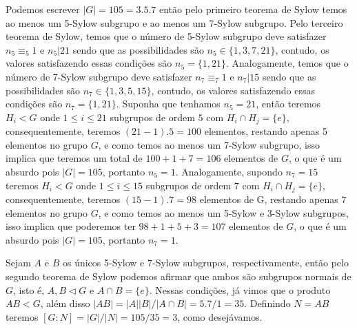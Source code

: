 \documentclass{article}
\begin{document}
\begin{enumerate}
		Podemos escrever $|G| = 105 = 3.5.7$ então pelo primeiro teorema de Sylow temos ao menos um 5-Sylow subgrupo e ao menos um 7-Sylow subgrupo. Pelo terceiro teorema de Sylow, temos que o número de 5-Sylow subgrupo deve satisfazer $n_{5} \equiv_{5} 1$ e $n_{5} | 21$ sendo que as possibilidades são $n_{5} \in \{1, 3, 7, 21\}$, contudo, os valores satisfazendo essas condições são $n_{5} = \{1, 21\}$. Analogamente, temos que o número de 7-Sylow subgrupo deve satisfazer $n_{7} \equiv_{7} 1$ e $n_{7} | 15$ sendo que as possibilidades são $n_{7} \in \{1, 3, 5, 15\}$, contudo, os valores satisfazendo essas condições são $n_{7} = \{1, 21\}$. Suponha que tenhamos $n_{5} = 21$, então teremos $H_{i} < G$ onde $1 \leq i \leq 21$ subgrupos de ordem $5$ com $H_{i} \cap H_{j} = \{e\}$, consequentemente, teremos $(21-1).5 = 100$ elementos, restando apenas 5 elementos no grupo $G$, e como temos ao menos um 7-Sylow subgrupo, isso implica que teremos um total de $100 + 1 + 7 = 106$ elementos de $G$, o que é um absurdo pois $|G| = 105$, portanto $n_{5} = 1$. Analogamente, supondo $n_{7} = 15$ teremos $H_{i} <G$ onde $1 \leq i \leq 15$ subgrupos de ordem $7$ com $H_{i} \cap H_{j} = \{e\}$, consequentemente, teremos $(15-1).7 = 98$ elementos de G, restando apenas $7$ elementos no grupo $G$, e como temos ao menos um 5-Sylow e 3-Sylow subgrupos, isso implica que poderemos ter $98+1+5+3 = 107$ elementos de $G$, o que é um absurdo pois $|G| = 105$, portanto $n_{7} = 1$.
		
		Sejam $A$ e $B$ os únicos 5-Sylow e 7-Sylow subgrupos,  respectivamente, então pelo segundo teorema de Sylow podemos afirmar que ambos são subgrupos normais de $G$, isto é, $A, B \vartriangleleft G$ e $A \cap B = \{e\}$. Nessas condições, já vimos que o produto $AB < G$, além disso $|AB| = |A||B|/|A\cap B| = 5.7/1 = 35$. Definindo $N = AB$ teremos $[G:N] = |G|/|N| = 105/35 = 3$, como desejávamos.
	\end{enumerate}
	
	
\end{document}
